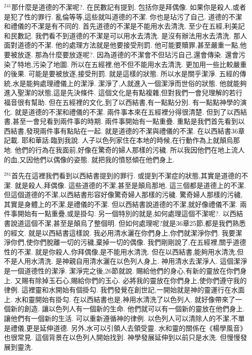 \documentclass{book}
\begin{document}
$^{241}$那什麼是道德的不潔呢?.
在民數記有提到.
包括你是拜偶像.
如果你是殺人,或者是犯了性的罪行.
亂倫等等,這些就叫道德的不潔.
你也是玷污了自己.
道德的不潔和禮儀的不潔是有不同的.
首先道德的不潔是不能用水去清洗.
至少在五經,利美記和民數記.
我們看不到道德的不潔是可以用水去清洗.
是沒有辦法用水去清洗.
那人面對道德的不潔.
他的處理方法就是他要接受刑罰.
他可能要贖罪,甚至嚴重一點,他要被放逐.
那為什麼要放逐呢?.
因為道德的不潔會不但玷污自己,還會傳染.
還會污染了特地,污染了地圖.
所以在五經裡,他不但不能用水去清洗.
更加用一些比較嚴重的後果.
可能是要被放逐,接受刑罰.
就是這樣的狀態.
所以水是關乎潔淨.
五經的傳統,水是能夠處理禮儀上的潔淨.
潔淨了,人就進入一個潔淨而世俗的狀態.
他就能夠進入聖潔的狀態,這是先決條件.
這個文化是有點複雜,但對我們一會兒理解的若行福音很有幫助.
但在五經裡的文化,到了以西結書,有一點點分別.
有一點點神學的演化.
就是道德的不潔和禮儀的不潔.
兩件事本來在五經裡分得很清楚.
但到了以西結書,甚至一會兒看到兩件事的時期.
兩件事開始有一點重疊.
重點是我們首先看到以西結書,發現兩件事有點貼在一起.
就是道德的不潔與禮儀的不潔.
在以西結書36章記載.
耶和華話:臨到我說.
人子以色列家住在本地的時候,在行動作為上就顛烏那地.
他們的行為在我面前,好像在驚奇的婦人那樣的污穢.
所以我因他們在地上流人的血,又因他們以偶像的姿態.
就把我的憤怒傾在他們身上.

$^{281}$首先在這裡我們看到以西結書提到的罪行.
或提到不潔症的狀態,其實是道德的不潔.
就是殺人,拜偶像.
這些道德的不潔,甚至是顛烏那地.
這三個都是道德上的不潔.
但這個道德的不潔,以西結書形容好像驚奇婦人那樣的污穢.
驚奇婦人那樣的污穢,其實是身體上的不潔,是禮儀的不潔.
但以西結書說道德的不潔,就好像禮儀不潔.
兩件事開始有一點重疊,或是掛勾.
另一個特別的就是,如何處理這個不潔呢?.
以西結書說道這個不潔,甚至是顛烏了整個明.
但如何處理呢?就是36章25節,都是我們熟悉的經文.
就是以西結書這樣說.
我必用清水灑在你們身上,你們就潔淨你們.
我要潔淨你們,使你們脫離一切的污穢,棄掉一切的偶像.
我們剛剛說了,在五經裡,關乎道德性的不潔.
就是你殺人,你拜偶像,是不能用水清洗.
但在以西結書,能夠用水清洗,但不是人用水清洗.
是神親自用清水灑在以色列人身上.
神用清水去潔淨人.
這個潔淨是一個道德性的潔淨.
潔淨完之後,26節就說.
賜給他們的身心,有新的靈放在你們身上.
又賜有除掉玉石心,賜給你們的玉心.
必將我的靈放在你們身上,使你們遵守我的律例.
這裡靈和水開始有個掛勾.
我們發覺在創世記,一開始就是神的靈運行在水面上.
水和靈開始有掛勾.
在以西結書也是,神用水清洗了以色列人.
就好像帶來了一個新的創造.
讓以色列人有一個新的生命.
他們就可以有一個新的靈放在他們身上.
讓他們有一個新的生活.
可以重新遵循神的律例.
以色列人可以清除人的不潔,不單是禮儀,更是延伸道德.
另外,水可以引領人去領受靈.
水和靈的關係在《楊學風音》也很常見.
這個背景在以色列人開始找到.
神學發展延伸到以前只是水洗.
但慢慢發展到靈洗.
\end{document}

